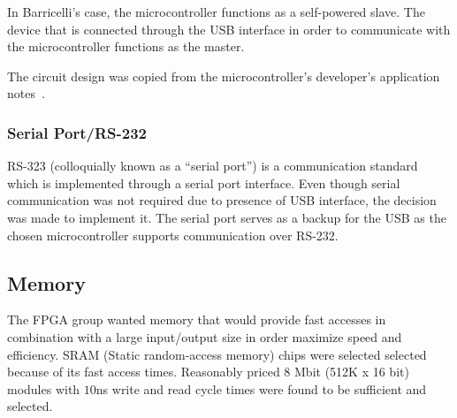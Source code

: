 In Barricelli's case, the microcontroller functions as a self-powered slave.
The device that is connected through the USB interface in order to communicate with the microcontroller functions as the master.

The circuit design was copied from the microcontroller's developer's application notes~\cite[Figure 2.2]{an0046}.


\subsubsection{Serial Port/RS-232} 
RS-323 (colloquially known as a ``serial port'') is a communication standard which is implemented through a serial port interface.
Even though serial communication was not required due to presence of USB interface, the decision was made to implement it.
The serial port serves as a backup for the USB as the chosen microcontroller supports communication over RS-232.

\subsection{Memory} \label{pcb:design-choices:ss:memory}
The FPGA group wanted memory that would provide fast accesses in combination with a large input/output size in order maximize speed and efficiency.
SRAM (Static random-access memory) chips were selected selected because of its fast access times.
Reasonably priced 8 Mbit (512K x 16 bit) modules with $10$ns write and read cycle times were found to be sufficient and selected. 

